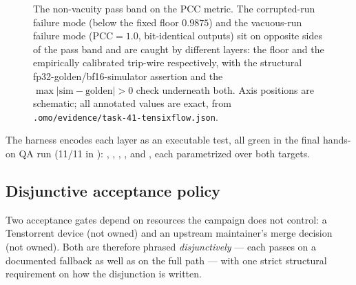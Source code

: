 \begin{figure}[t]
  \caption{The non-vacuity pass band on the PCC metric. The corrupted-run failure
    mode (below the fixed floor $0.9875$) and the vacuous-run failure mode
    ($\mathrm{PCC}=1.0$, bit-identical outputs) sit on opposite sides of the pass
    band and are caught by different layers: the floor and the empirically
    calibrated trip-wire respectively, with the structural fp32-golden/bf16-simulator
    assertion and the $\max|\text{sim}-\text{golden}|>0$ check underneath both.
    Axis positions are schematic; all annotated values are exact, from
    \texttt{.omo/evidence/task-41-tensixflow.json}.}
  \label{fig:policy-pcc-band}
\end{figure}

The harness encodes each layer as an executable test, all green in the final
hands-on QA run (11/11 in ):
,
,
,
, and
, each parametrized over
both targets.

\subsection{Disjunctive acceptance policy}
\label{sec:policy-disjunctive}

Two acceptance gates depend on resources the campaign does not control: a
Tenstorrent device (not owned) and an upstream maintainer's merge decision (not
owned). Both are therefore phrased \emph{disjunctively} --- each passes on a
documented fallback as well as on the full path --- with one strict structural
requirement on how the disjunction is written.

